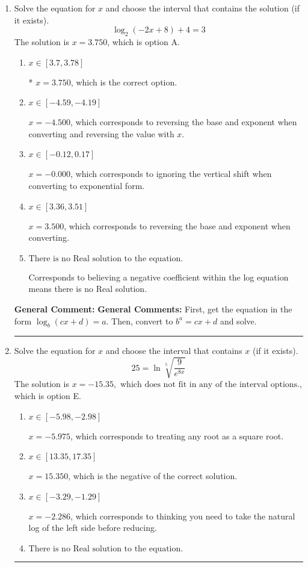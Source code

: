 \documentclass{extbook}[14pt]
\newcommand{\litem}[1]{\item #1

\rule{\textwidth}{0.4pt}}
\begin{document}
\begin{enumerate}\litem{
Solve the equation for $x$ and choose the interval that contains the solution (if it exists).
\[ \log_{2}{(-2x+8)}+4 = 3 \]The solution is \( x = 3.750 \), which is option A.\begin{enumerate}[label=\Alph*.]
\item \( x \in [3.7, 3.78] \)

* $x = 3.750$, which is the correct option.
\item \( x \in [-4.59, -4.19] \)

$x = -4.500$, which corresponds to reversing the base and exponent when converting and reversing the value with $x$.
\item \( x \in [-0.12, 0.17] \)

$x = -0.000$, which corresponds to ignoring the vertical shift when converting to exponential form.
\item \( x \in [3.36, 3.51] \)

$x = 3.500$, which corresponds to reversing the base and exponent when converting.
\item \( \text{There is no Real solution to the equation.} \)

Corresponds to believing a negative coefficient within the log equation means there is no Real solution.
\end{enumerate}

\textbf{General Comment:} \textbf{General Comments:} First, get the equation in the form $\log_b{(cx+d)} = a$. Then, convert to $b^a = cx+d$ and solve.
}
\litem{
 Solve the equation for $x$ and choose the interval that contains $x$ (if it exists).
\[  25 = \ln{\sqrt[5]{\frac{9}{e^{8x}}}} \]The solution is \( x = -15.35, \text{ which does not fit in any of the interval options.} \), which is option E.\begin{enumerate}[label=\Alph*.]
\item \( x \in [-5.98, -2.98] \)

$x = -5.975$, which corresponds to treating any root as a square root.
\item \( x \in [13.35, 17.35] \)

$x = 15.350$, which is the negative of the correct solution.
\item \( x \in [-3.29, -1.29] \)

$x = -2.286$, which corresponds to thinking you need to take the natural log of the left side before reducing.
\item \( \text{There is no Real solution to the equation.} \)


\end{enumerate}}
\end{enumerate}
\end{document}
